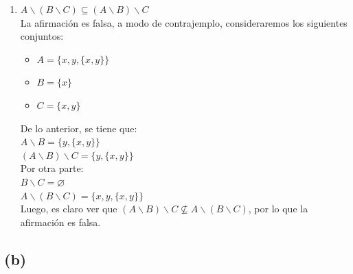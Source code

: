 \documentclass[12pt]{article}
\begin{document}
\begin{enumerate}
    \item $A \backslash (B \backslash C) \subseteq (A \backslash B) \backslash C$\\
    La afirmación es falsa, a modo de contrajemplo, consideraremos los siguientes conjuntos:
    \begin{itemize}
        \item $A = \{x, y, \{x, y\}\}$
        \item $B = \{x\}$
        \item $C = \{x, y\}$
    \end{itemize}
    De lo anterior, se tiene que:\\
    
    $A \backslash B = \{y, \{x, y\}\}$\\
    $(A \backslash B) \backslash C = \{y, \{x, y\}\}$\\
    
    Por otra parte:\\
    $B \backslash C = \varnothing$\\
    $A \backslash (B \backslash C) = \{x, y, \{x, y\}\}$\\
    
    Luego, es claro ver que $(A \backslash B) \backslash C \nsubseteq  A \backslash (B \backslash C)$, 
    por lo que la afirmación es falsa.
    
\end{enumerate}

\subsection*{(b)}
\end{document}
